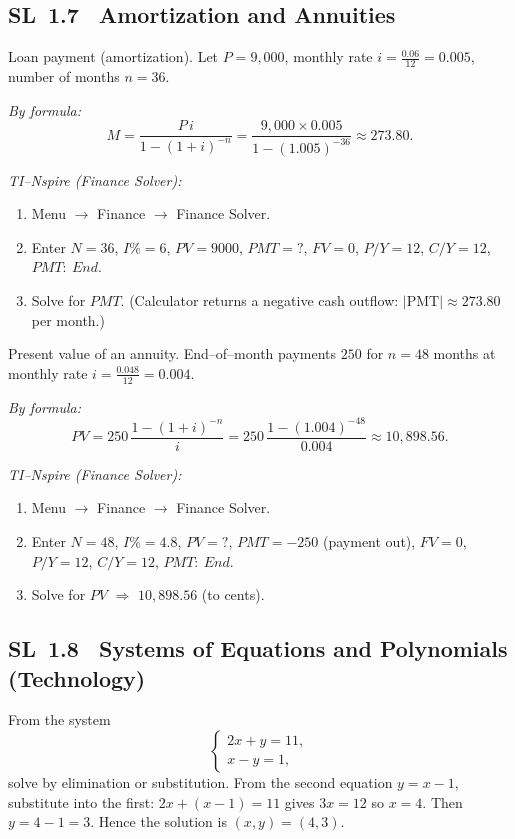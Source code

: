 \documentclass[11pt]{article}
\def\textbf#1{#1}%
\def\mathbf#1{#1}%
\newcommand{\tocsubsection}[1]{\subsection{#1}}
\begin{document}
\tocsubsection{SL 1.7 \; Amortization and Annuities}

\begin{solution}
\textbf{Loan payment (amortization).} Let \(P=9{,}000\), monthly rate \(i=\tfrac{0.06}{12}=0.005\), number of months \(n=36\).

\emph{By formula:}
\[
M=\frac{P\,i}{1-(1+i)^{-n}}
=\frac{9{,}000\times 0.005}{1-(1.005)^{-36}}
\approx \boxed{273.80}.
\]

\emph{TI–Nspire (Finance Solver):}
\begin{enumerate}[itemsep=1pt]
  \item \textbf{Menu} \(\to\) \textbf{Finance} \(\to\) \textbf{Finance Solver}.
  \item Enter \(\mathbf{N}=36\), \(\mathbf{I\%}=6\), \(\mathbf{PV}=9000\), \(\mathbf{PMT}=?\),
        \(\mathbf{FV}=0\), \(\mathbf{P/Y}=12\), \(\mathbf{C/Y}=12\), \(\mathbf{PMT:\ End}\).
  \item Solve for \(\textbf{PMT}\). (Calculator returns a negative cash outflow:
        \(|\text{PMT}|\approx \boxed{273.80}\) per month.)
\end{enumerate}
\end{solution}

\begin{solution}
\textbf{Present value of an annuity.} End–of–month payments \(250\) for \(n=48\) months at monthly rate
\(i=\tfrac{0.048}{12}=0.004\).

\emph{By formula:}
\[
PV=250\,\frac{1-(1+i)^{-n}}{i}
=250\,\frac{1-(1.004)^{-48}}{0.004}
\approx \boxed{10{,}898.56}.
\]

\emph{TI–Nspire (Finance Solver):}
\begin{enumerate}[itemsep=1pt]
  \item \textbf{Menu} \(\to\) \textbf{Finance} \(\to\) \textbf{Finance Solver}.
  \item Enter \(\mathbf{N}=48\), \(\mathbf{I\%}=4.8\), \(\mathbf{PV}=?\),
        \(\mathbf{PMT}=-250\) (payment out), \(\mathbf{FV}=0\),
        \(\mathbf{P/Y}=12\), \(\mathbf{C/Y}=12\), \(\mathbf{PMT:\ End}\).
  \item Solve for \(\textbf{PV}\) \(\Rightarrow\) \(\boxed{10{,}898.56}\) (to cents).
\end{enumerate}
\end{solution}



\tocsubsection{SL 1.8 \; Systems of Equations and Polynomials (Technology)}

\begin{solution}
From the system 
\[
\begin{cases}
2x + y = 11,\\
x - y = 1,
\end{cases}
\]
solve by elimination or substitution. From the second equation $y = x - 1$, substitute into the first: $2x + (x - 1) = 11$ gives $3x=12$ so $x=4$. Then $y = 4 - 1 = 3$. Hence the solution is $(x,y)=(4,3)$.
\end{solution}
\end{document}
